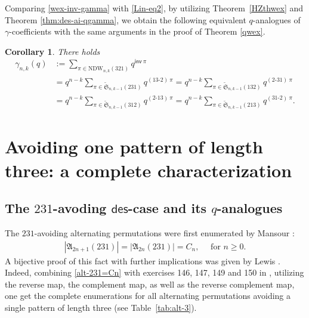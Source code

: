\documentclass[12pt,reqno]{amsart}
\numberwithin{equation}{section}
\theoremstyle{plain}
\newtheorem{corollary}[theorem]{Corollary}
\theoremstyle{definition}
\def\S{\mathfrak{S}}
\def\A{\mathfrak{A}}
\def\des{\mathsf{des}}
\def\inv{\mathsf{inv}}
\def\cab{31\text{-}2}
\def\bca{2\text{-}31}
\def\acb{13\text{-}2}
\def\bac{2\text{-}13}
\begin{document}
Comparing \eqref{wex-inv-gamma} with \eqref{Lin-eq2}, by utilizing Theorem~\ref{HZthwex} and Theorem \ref{thm:des-ai-qgamma}, we obtain the following equivalent
$q$-analogues of $\gamma$-coefficients with the same arguments in the proof of Theorem \ref{qwex}.

\begin{corollary}\label{gammacoef-othercomb}
There holds
\begin{align*}
\gamma_{n, k}(q)&:=\sum_{\pi\in \mathrm{NDW}_{n,k}(321)}q^{\inv\:\pi}\\

&=q^{n-k}\sum_{\pi\in \widetilde{\S}_{n,k-1}(231)}q^{(\acb)\:\pi}=q^{n-k}\sum_{\pi\in \widetilde{\S}_{n,k-1}(132)}q^{(\bca)\:\pi}\\

&=q^{n-k}\sum_{\pi\in \widetilde{\S}_{n,k-1}(312)}q^{(\bac)\:\pi}=q^{n-k}\sum_{\pi\in \widetilde{\S}_{n,k-1}(213)}q^{(\cab)\:\pi}.
\end{align*}
\end{corollary}



\section{Avoiding one pattern of length three: a complete characterization}\label{sec5: Cat}

\subsection{\texorpdfstring{The $231$-avoding $\des$-case and its $q$-analogues}{}}
The $231$-avoiding alternating permutations were first enumerated by Mansour \cite{Man}:
\begin{align}\label{alt-231=Cn}
|\A_{2n+1}(231)|=|\A_{2n}(231)|=C_n,\quad \text{ for }n\ge 0.
\end{align}
A bijective proof of this fact with further implications was given by Lewis \cite{Lew1}. Indeed, combining \eqref{alt-231=Cn} with exercises 146, 147, 149 and 150 in \cite{Sta2}, utilizing the reverse map, the complement map, as well as the reverse complement map, one get the complete enumerations for all alternating permutations avoiding a single pattern of length three (see Table~\ref{tab:alt-3}).
\end{document}
